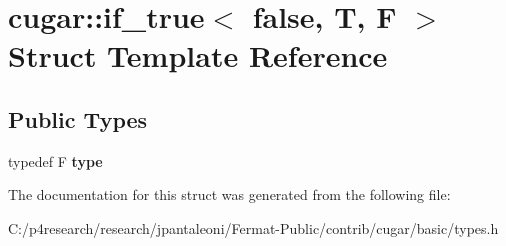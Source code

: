 \hypertarget{structcugar_1_1if__true_3_01false_00_01_t_00_01_f_01_4}{}\section{cugar\+:\+:if\+\_\+true$<$ false, T, F $>$ Struct Template Reference}
\label{structcugar_1_1if__true_3_01false_00_01_t_00_01_f_01_4}
\subsection*{Public Types}
\begin{DoxyCompactItemize}
\item 
\mbox{\label{structcugar_1_1if__true_3_01false_00_01_t_00_01_f_01_4_afd3d7625ea886fb5422fd3a3aea21cdb}} 
typedef F {\bfseries type}
\end{DoxyCompactItemize}


The documentation for this struct was generated from the following file\+:\begin{DoxyCompactItemize}
\item 
C\+:/p4research/research/jpantaleoni/\+Fermat-\/\+Public/contrib/cugar/basic/types.\+h\end{DoxyCompactItemize}
